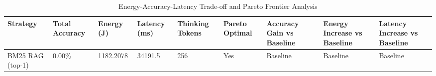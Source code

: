 \begin{table}
\caption{Energy-Accuracy-Latency Trade-off and Pareto Frontier Analysis}
\label{tab:tradeoff_comparison}
\begin{tabular}{lllllllll}
\toprule
Strategy & Total Accuracy & Energy (J) & Latency (ms) & Thinking Tokens & Pareto Optimal & Accuracy Gain vs Baseline & Energy Increase vs Baseline & Latency Increase vs Baseline \\
\midrule
BM25 RAG (top-1) & 0.00\% & 1182.2078 & 34191.5 & 256 & Yes & Baseline & Baseline & Baseline \\
\bottomrule
\end{tabular}
\end{table}
